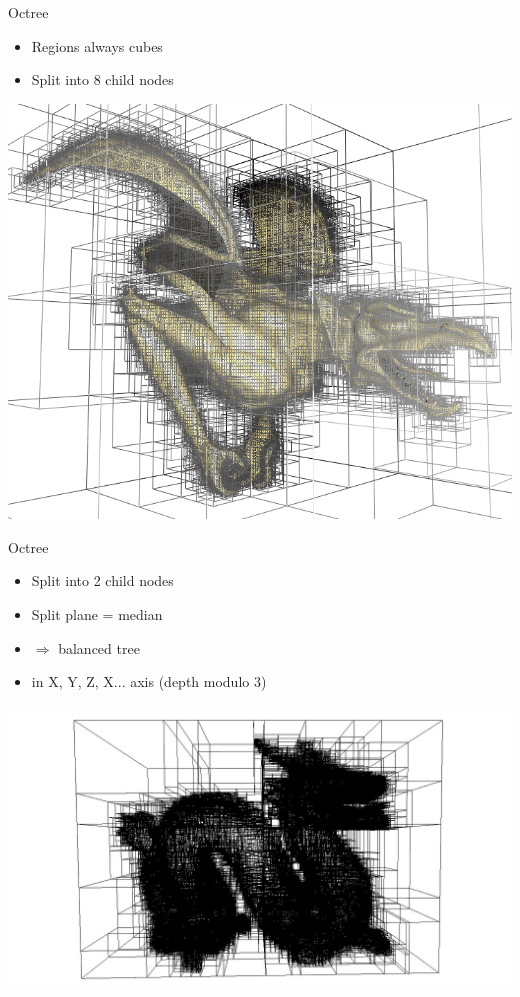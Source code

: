 \documentclass{beamer}
\begin{document}
\begin{frame}{Octree}
	\begin{itemize}
	\item Regions always cubes
	\item Split into 8 child nodes
	\end{itemize}
	\begin{center}
	\includegraphics[width=.7\textwidth]{octree_dragon.png} \\
	\end{center}
\end{frame}

\begin{frame}{Octree}
	\begin{itemize}
	\item Split into 2 child nodes
	\item Split plane = median
	\item $\Rightarrow$ balanced tree
	\item in X, Y, Z, X... axis (depth modulo 3)
	\end{itemize}
	\begin{center}
	\includegraphics[width=.8\textwidth]{kdtree_dragon.jpg} \\
	\end{center}
\end{frame}
\end{document}
